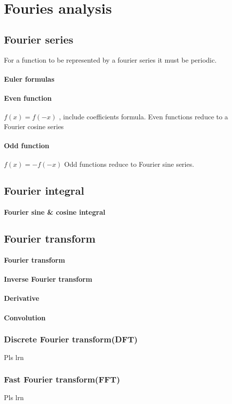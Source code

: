 \section{Fouries analysis}

\subsection{Fourier series}
For a function to be represented by a fourier series it must be
periodic.

\paragraph{Euler formulas}
\paragraph{Even function} $f(x) = f(-x)$ , include coefficients
formula. Even functions reduce to a Fourier cosine series
\paragraph{Odd function}  $f(x) = - f(-x)$ Odd functions reduce to
Fourier sine series.

\subsection{Fourier integral}
\paragraph{Fourier sine \& cosine integral}

\subsection{Fourier transform}

\paragraph{Fourier transform}
\paragraph{Inverse Fourier transform}
\paragraph{Derivative}
\paragraph{Convolution}



\subsubsection{Discrete Fourier transform(DFT)}
Pls lrn

\subsubsection{Fast Fourier transform(FFT)}
Pls lrn

